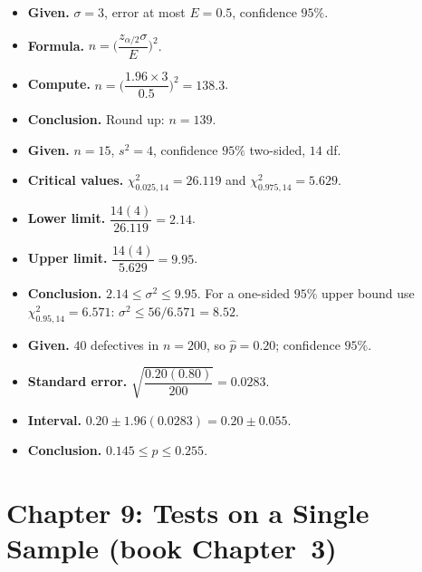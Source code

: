 \begin{example}
\begin{itemize}
  \item \textbf{Given.} $\sigma=3$, error at most $E=0.5$, confidence $95\%$.
  \item \textbf{Formula.} $n=\Big(\dfrac{z_{\alpha/2}\sigma}{E}\Big)^2$.
  \item \textbf{Compute.} $n=\Big(\dfrac{1.96\times3}{0.5}\Big)^2=138.3$.
  \item \textbf{Conclusion.} Round up: $n=139$.
\end{itemize}
\end{example}

\begin{example}
\begin{itemize}
  \item \textbf{Given.} $n=15$, $s^2=4$, confidence $95\%$ two-sided, $14$ df.
  \item \textbf{Critical values.} $\chi^2_{0.025,14}=26.119$ and $\chi^2_{0.975,14}=5.629$.
  \item \textbf{Lower limit.} $\dfrac{14(4)}{26.119}=2.14$.
  \item \textbf{Upper limit.} $\dfrac{14(4)}{5.629}=9.95$.
  \item \textbf{Conclusion.} $2.14\le\sigma^2\le9.95$. For a one-sided $95\%$ upper bound use $\chi^2_{0.95,14}=6.571$: $\sigma^2\le56/6.571=8.52$.
\end{itemize}
\end{example}

\begin{example}
\begin{itemize}
  \item \textbf{Given.} $40$ defectives in $n=200$, so $\hat{p}=0.20$; confidence $95\%$.
  \item \textbf{Standard error.} $\sqrt{\dfrac{0.20(0.80)}{200}}=0.0283$.
  \item \textbf{Interval.} $0.20\pm1.96(0.0283)=0.20\pm0.055$.
  \item \textbf{Conclusion.} $0.145\le p\le0.255$.
\end{itemize}
\end{example}

\section{Chapter 9: Tests on a Single Sample (book Chapter~3)}

